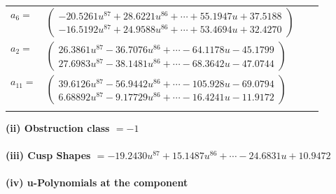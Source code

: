 \documentclass[1p]{elsarticle_modified}
\theoremstyle{definition}
\begin{document}
\begin{tabular}{m{7pt} m{180pt} m{7pt} m{180pt} }
\flushright $a_{6}=$&$\begin{pmatrix}-20.5261 u^{87}+28.6221 u^{86}+\cdots+55.1947 u+37.5188\\-16.5192 u^{87}+24.9588 u^{86}+\cdots+53.4694 u+32.4270\end{pmatrix}$ \\
\flushright $a_{2}=$&$\begin{pmatrix}26.3861 u^{87}-36.7076 u^{86}+\cdots-64.1178 u-45.1799\\27.6983 u^{87}-38.1481 u^{86}+\cdots-68.3642 u-47.0744\end{pmatrix}$ \\
\flushright $a_{11}=$&$\begin{pmatrix}39.6126 u^{87}-56.9442 u^{86}+\cdots-105.928 u-69.0794\\6.68892 u^{87}-9.17729 u^{86}+\cdots-16.4241 u-11.9172\end{pmatrix}$\\&\end{tabular}
\flushleft \textbf{(ii) Obstruction class $= -1$}\\~\\
\flushleft \textbf{(iii) Cusp Shapes $= -19.2430 u^{87}+15.1487 u^{86}+\cdots-24.6831 u+10.9472$}\\~\\
\newpage\renewcommand{\arraystretch}{1}
\flushleft \textbf{(iv) u-Polynomials at the component}\newline \\
\end{document}
